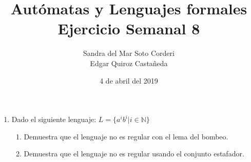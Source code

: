 \documentclass{article}
\begin{document}
    \title{
        Autómatas y Lenguajes formales \\
        Ejercicio Semanal 8
    }

    \author{
        Sandra del Mar Soto Corderi \\
        Edgar Quiroz Castañeda
    }

    \date{
        4 de abril del 2019
    }
    
    \maketitle

    \begin{enumerate}
        \item {
        Dado el siguiente lenguaje: $L = \{a^ib^i | i \in \mathbb{N} \}$
        \begin{enumerate}
        	\item {
        	Demuestra que el lenguaje no es regular con el lema del bombeo.
        	}\\
        	
        	\item{
        	Demuestra que el lenguaje no es regular usando el conjunto estafador.
        	}
        \end{enumerate}
    	}
    \end{enumerate}
\end{document}
